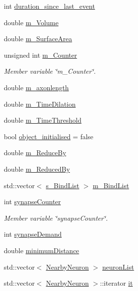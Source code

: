 \begin{DoxyCompactItemize}
\item 
int \mbox{\hyperlink{classSynapse_a5b05eaf7f8c95e4412463cbc54ec0cd0}{duration\+\_\+since\+\_\+last\+\_\+event}}
\item 
double \mbox{\hyperlink{classSynapse_ad606b920c0697597dae790058c0ea5bf}{m\+\_\+\+Volume}}
\item 
double \mbox{\hyperlink{classSynapse_a0336f1a0df81845e61ab9639589240e6}{m\+\_\+\+Surface\+Area}}
\item 
unsigned int \mbox{\hyperlink{classSynapse_a845035b8a77969ef9de4e5c51089b42c}{m\+\_\+\+Counter}}
\begin{DoxyCompactList}\small\item\em Member variable \char`\"{}m\+\_\+\+Counter\char`\"{}. \end{DoxyCompactList}\item 
double \mbox{\hyperlink{classSynapse_a66b616d22d5ff93d6481e3487cb4edc2}{m\+\_\+axonlength}}
\item 
double \mbox{\hyperlink{classSynapse_aa3e1102b0b329c90a4dc00e2c8529fd1}{m\+\_\+\+Time\+Dilation}}
\item 
double \mbox{\hyperlink{classSynapse_aa7a0fce115380ee73b87a9453649c770}{m\+\_\+\+Time\+Threshold}}
\item 
bool \mbox{\hyperlink{classSynapse_ae08f3f0cdb44d68cbf65e61887965b34}{object\+\_\+initialised}} = false
\item 
double \mbox{\hyperlink{classSynapse_aded55ae9dd54f3a4fa0294c6121d7f9f}{m\+\_\+\+Reduce\+By}}
\item 
double \mbox{\hyperlink{classSynapse_a569f2e76d59331d4b0a55a22df208824}{m\+\_\+\+Reduced\+By}}
\item 
std\+::vector$<$ \mbox{\hyperlink{structSynapse_1_1s__BindList}{s\+\_\+\+Bind\+List}} $>$ \mbox{\hyperlink{classSynapse_a8b176e0e09c16a09718fb30a84552734}{m\+\_\+\+Bind\+List}}
\item 
int \mbox{\hyperlink{classSynapse_a776b521162c8544118fa9b555b866fdf}{synapse\+Counter}}
\begin{DoxyCompactList}\small\item\em Member variable \char`\"{}synapse\+Counter\char`\"{}. \end{DoxyCompactList}\item 
int \mbox{\hyperlink{classSynapse_a9395cb1a49c5b736647b17dcfa23895d}{synapse\+Demand}}
\item 
double \mbox{\hyperlink{classSynapse_a3021c0f2231d913c2a78d287d9529b6d}{minimum\+Distance}}
\item 
std\+::vector$<$ \mbox{\hyperlink{structSynapse_1_1NearbyNeuron}{Nearby\+Neuron}} $>$ \mbox{\hyperlink{classSynapse_af3238e299887b45563d2cd4415c96322}{neuron\+List}}
\item 
std\+::vector$<$ \mbox{\hyperlink{structSynapse_1_1NearbyNeuron}{Nearby\+Neuron}} $>$\+::iterator \mbox{\hyperlink{classSynapse_ad99978eedee263fa3fdb8e4673fb0f93}{it}}
\end{DoxyCompactItemize}
